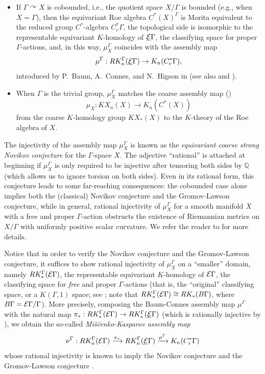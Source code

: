 \documentclass[11pt]{article}
\theoremstyle{definition}
\theoremstyle{plain}
\def\EG{\underline{\E}\Gamma}
\def\Ga{\Gamma}
\def\car{\curvearrowright}
\begin{document}
\begin{itemize}
	\item If $\Ga\car X$ is cobounded, i.e., the quotient space $X/\Ga$ is bounded (e.g., when $X = \Ga$), then the equivariant Roe algebra $C^*(X)^{\Ga}$ is Morita equivalent to the reduced group $C^*$-algebra $C^*_r\Ga$, the topological side is isomorphic to the representable equivariant $K$-homology of $\EG$, the classifying space for proper $\Ga$-actions, 
	and, in this way, $\mu_X^{\Ga}$ coincides with the assembly map 
	$$\mu^{\Ga}:RK^{\Ga}_n(\EG)\to K_n(C^*_r\Ga),$$
	introduced by P.~Baum, A.~Connes, and N.~Higson in \cite{BCH1994} (see also \cite{BC1988} and \cite[Section 4]{KS2003}). 
	
	
	\item When $\Ga$ is the trivial group, 
	$\mu_X^{\Ga}$ matches the coarse assembly map (\cite{HR1993, YuCBC95})
	\[
	\mu_{X}:KX_n(X)\to K_n(C^*(X))
	\]
	from the coarse $K$-homology group $KX_*(X)$ to the $K$-theory of the Roe algebra of $X$.  
\end{itemize}
The injectivity of the assembly map $\mu_X^{\Ga}$ is known as the \emph{equivariant coarse strong Novikov conjecture} for the $\Ga$-space $X$. 
The adjective ``rational'' is attached at beginning if $\mu_X^{\Ga}$ is only required to be injective after tensoring both sides by $\mathbb{Q}$ (which allows us to ignore torsion on both sides). 
Even in its rational form, this conjecture leads to some far-reaching consequences: the cobounded case alone implies both the (classical) Novikov conjecture and the Gromov-Lawson conjecture, while in general, rational injectivity of $\mu_X^{\Ga}$ for a smooth manifold $X$ with a free and proper $\Ga$-action obstructs the existence of Riemannian metrics on $X / \Ga$ with uniformly positive scalar curvature. 
We refer the reader to \cite[Chapter~7]{HIT2020} for more details. 

Notice that in order to verify the Novikov conjecture and the Gromov-Lawson conjecture, it suffices to show rational injectivity of $\mu_X^{\Ga}$ on a ``smaller'' domain, namely $RK^{\Ga}_*(\E\Ga)$, the representable equivariant $K$-homology of $\E\Ga$, the classifying space for \emph{free} and proper $\Ga$-actions (that is, the ``original'' classifying space, or a $K(\Ga,1)$ space; see \cite[Section 1.B]{Hatcher}; note that $RK^{\Ga}_*(\E\Ga) \cong RK_*(B\Ga)$, where $B\Ga = \E\Ga / \Ga$). 
More precisely, composing the Baum-Connes assembly map $\mu^{\Ga}$ with the natural map $\pi_* : RK^{\Ga}_*(\E\Ga) \to RK^{\Ga}_*(\EG)$ (which is rationally injective by \cite[Section~7]{BCH1994}), we obtain the so-called \emph{Miščenko-Kasparov assembly map}
$$\nu^{\Ga}:RK^{\Ga}_n(\E\Ga)  \xrightarrow{\pi_*} RK^{\Ga}_n(\EG) \xrightarrow{\mu^{\Ga}} K_n(C^*_r\Ga)$$
whose rational injectivity is known to imply the Novikov conjecture and the Gromov-Lawson conjecture \cite{Lusztig1972,Misc1974,Kas83,Rosenberg1983}. 
\end{document}
